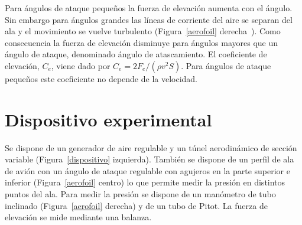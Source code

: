 \documentclass[11pt]{articulo}
\begin{document}
Para \'angulos de ataque peque\~nos la fuerza de elevaci\'on aumenta con el \'angulo. Sin embargo para \'angulos grandes las l\'ineas de corriente del aire se separan del ala y el movimiento se vuelve turbulento (Figura~\ref{aerofoil} derecha~\cite{babinsky}). Como consecuencia la fuerza de elevaci\'on disminuye para \'angulos mayores que un \'angulo de ataque, denominado \'angulo de atascamiento. El coeficiente de elevaci\'on, $C_e$, viene dado por $C_e = 2 F_e / (\rho v^2 S)$. Para \'angulos de ataque peque\~nos este coeficiente no depende de la velocidad.


\section{Dispositivo experimental}

Se dispone de un generador de aire regulable y un t\'unel aerodin\'amico de secci\'on variable (Figura~\ref{dispositivo} izquierda). Tambi\'en se dispone de un perfil de ala de avi\'on con un \'angulo de ataque regulable con agujeros en la parte superior e inferior (Figura~\ref{aerofoil} centro) lo que permite medir la presi\'on en distintos puntos del ala. Para medir la presi\'on se dispone de un man\'ometro de tubo inclinado (Figura~\ref{aerofoil} derecha) y de un tubo de Pitot. La fuerza de elevaci\'on se mide mediante una balanza.
%
\end{document}
